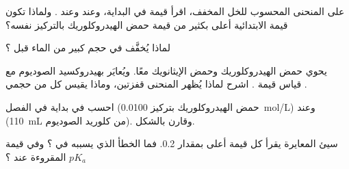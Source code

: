 \begin{exercise}[$\star\star$]\label{exo:g12:ph-conductivity-titrations:10}
على المنحنى المحسوب للخل المخفف، اقرأ قيمة  في البداية،
وعند  وعند . ولماذا تكون قيمة  الابتدائية أعلى بكثير
من قيمة  حمض الهيدروكلوريك بالتركيز نفسه؟
\end{exercise}

\begin{exercise}[$\star\star$]\label{exo:g12:ph-conductivity-titrations:11}
لماذا يُخفَّف  في حجم كبير من الماء قبل
؟
\end{exercise}

\begin{exercise}[$\star\star\star$]\label{exo:g12:ph-conductivity-titrations:12}
يحوي  حمض الهيدروكلوريك وحمض الإيثانويك معًا. ويُعايَر
بهيدروكسيد الصوديوم مع قياس قيمة . اشرح لماذا يُظهر
المنحنى قفزتين، وماذا يقيس كل من حجمي .
\end{exercise}

\begin{exercise}[$\star\star\star$]\label{exo:g12:ph-conductivity-titrations:13}
احسب  في بداية  في
الفصل (حمض الهيدروكلوريك بتركيز \qty{0.0100}{mol/L}) وعند 
(\qty{110}{mL} من  كلوريد الصوديوم). وقارن بالشكل.
\end{exercise}

\begin{exercise}[$\star\star\star$]\label{exo:g12:ph-conductivity-titrations:14}
 سيئ المعايرة يقرأ كل قيمة  أعلى بمقدار 0.2. فما الخطأ الذي
يسببه في  ؟ وفي قيمة $pK_a$
المقروءة عند ؟
\end{exercise}

